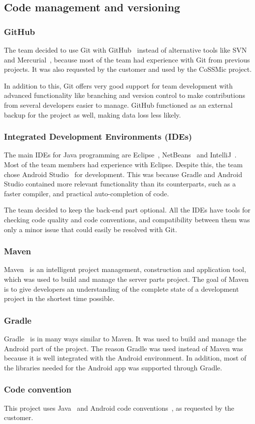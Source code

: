 \subsection{Code management and versioning}
\subsubsection{GitHub}
The team decided to use Git with GitHub~\cite{github} instead of alternative tools like SVN~\cite{svn} and Mercurial~\cite{mercurial}, because most of the team had experience with Git from previous projects. It was also requested by the customer and used by the CoSSMic project. 

In addition to this, Git offers very good support for team development with advanced functionality like branching and version control to make contributions from several developers easier to manage. GitHub functioned as an external backup for the project as well, making data loss less likely.

\subsubsection{Integrated Development Environments (IDEs)}
The main IDEs for Java programming are Eclipse~\cite{eclipse}, NetBeans~\cite{netbeans} and IntelliJ~\cite{intellij}. Most of the team members had experience with Eclipse. Despite this, the team chose Android Studio~\cite{android-studio} for development. This was because Gradle and Android Studio contained more relevant functionality than its counterparts, such as a faster compiler, and practical auto-completion of code.

The team decided to keep the back-end part optional. All the IDEs have tools for checking code quality and code conventions, and compatibility between them was only a minor issue that could easily be resolved with Git.

\subsubsection{Maven}
Maven~\cite{maven} is an intelligent project management, construction and application tool, which was used to build and manage the server parts project. The goal of Maven is to give developers an understanding of the complete state of a development project in the shortest time possible.

\subsubsection{Gradle}
Gradle~\cite{gradle} is in many ways similar to Maven. It was used to build and manage the Android part of the project. The reason Gradle was used instead of Maven was because it is well integrated with the Android environment. In addition, most of the libraries needed for the Android app was supported through Gradle.

\subsubsection{Code convention}
This project uses Java~\cite{javaconv} and Android code conventions~\cite{androidconv}, as requested by the customer.
